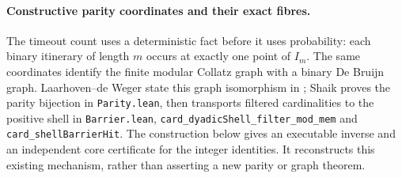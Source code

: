 \documentclass[11pt]{article}
\theoremstyle{remark}\newtheorem{remark}[proposition]{Remark}
\begin{document}
\paragraph{Constructive parity coordinates and their exact fibres.}
The timeout count uses a deterministic fact before it uses probability:
each binary itinerary of length \(m\) occurs at exactly one point of
\(I_m\). The same coordinates identify the finite modular Collatz graph
with a binary De Bruijn graph. Laarhoven--de Weger state this graph
isomorphism in \cite[Section~2]{LaarhovenDeWeger2012}; Shaik proves the
parity bijection in \texttt{Parity.lean}, then transports filtered
cardinalities to the positive shell in
\texttt{Barrier.lean}, \texttt{card\_dyadicShell\_filter\_mod\_mem} and
\texttt{card\_shellBarrierHit}. The construction below gives an executable
inverse and an independent core certificate for the integer identities.
It reconstructs this existing mechanism, rather than asserting a new
parity or graph theorem.
\end{document}
